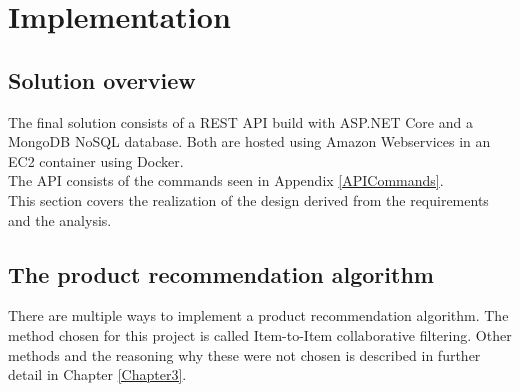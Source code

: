
\chapter{Implementation} %

\label{Chapter5} %


\section{Solution overview}

The final solution consists of a \gls{REST} API build with ASP.NET Core and a MongoDB \gls{NoSQL} database. Both are hosted using Amazon Webservices in an EC2 container using Docker. \\
The API consists of the commands seen in Appendix \ref{APICommands}. \\

This section covers the realization of the design derived from the requirements and the analysis.

\section{The product recommendation algorithm}
There are multiple ways to implement a product recommendation algorithm. The method chosen for this project is called Item-to-Item collaborative filtering. Other methods and the reasoning why these were not chosen is described in further detail in Chapter \ref{Chapter3}. \\\\

